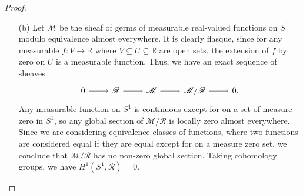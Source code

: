 \documentclass{article}
\newcommand{\fM}{\mathscr{M}}
\newcommand{\fR}{\mathscr{R}}
\newcommand{\R}{\mathbb{R}}
\begin{document}
\begin{enumerate} [label=\textbf{\arabic*.}, leftmargin=0em]
\begin{proof}
\begin{itemize} [leftmargin=0cm]
\item[(b)] Let $\fM$ be the sheaf of germs of measurable real-valued functions on $S^1$ modulo equivalence almost everywhere. It is clearly flasque, since for any measurable $f : V \to \R$ where $V \subseteq U \subseteq \R$ are open sets, the extension of $f$ by zero on $U$ is a measurable function. Thus, we have an exact sequence of sheaves
\[ \begin{tikzcd}
    0 \arrow[r] & \fR \arrow[r] & \fM \arrow[r] & \fM/\fR \arrow[r] & 0.
    \end{tikzcd} \]
Any measurable function on $S^1$ is continuous except for on a set of measure zero in $S^1$, so any global section of $\fM / \fR$ is locally zero almost everywhere. Since we are considering equivalence classes of functions, where two functions are considered equal if they are equal except for on a measure zero set, we conclude that $\fM / \fR$ has no non-zero global section. Taking cohomology groups, we have $H^1(S^1, \fR) = 0$.

\end{itemize}
\end{proof}

\end{enumerate}
\end{document}
